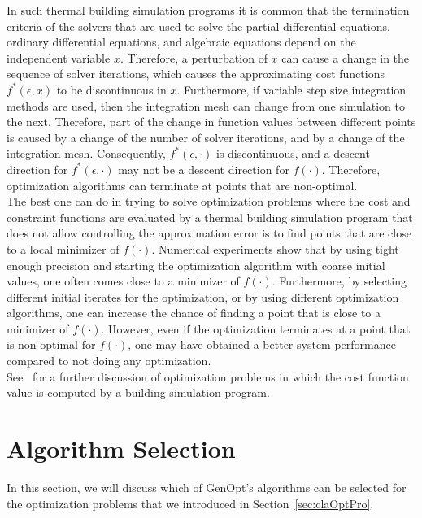 In such thermal building simulation programs
it is common that the termination criteria of the solvers that are used 
to solve the partial differential equations, ordinary differential equations, and
algebraic equations depend on the independent variable $x$.
Therefore, a perturbation of $x$ can cause 
a change in the sequence of solver iterations,
which causes the approximating cost functions $f^*(\epsilon,x)$ 
to be discontinuous in $x$.
Furthermore, if variable step size integration methods are used,
then the integration mesh can change from one simulation to the next.
Therefore, part of the change in function values between different points is
caused by a change of the number of solver iterations, and
by a change of the integration mesh.
Consequently, $f^*(\epsilon,\cdot)$ is discontinuous, and
a descent direction for $f^*(\epsilon,\cdot)$ may not be a descent direction 
for $f(\cdot)$.
Therefore, optimization algorithms
can terminate at points that are non-optimal.\\

The best one can do in trying to solve optimization problems where the cost and constraint functions are evaluated by a thermal building simulation program
that does not allow controlling the approximation error
is to find points that are close to a local minimizer of $f(\cdot)$.
Numerical experiments show that by using tight enough precision and 
starting the optimization algorithm with coarse initial values,
one often comes close to a minimizer of $f(\cdot)$.
Furthermore, by selecting different initial iterates for the optimization,
or by using different optimization algorithms, one can increase the chance of 
finding a point that is close to a minimizer of $f(\cdot)$.
However, even if the optimization terminates at a point 
that is non-optimal for $f(\cdot)$,
one may have obtained a better system performance compared to not doing any optimization.\\

See~\cite{WetterPolak2003:1,WetterWright2003:1} for a further discussion 
of optimization problems in which the cost function value is computed
by a building simulation program.

\section{Algorithm Selection}
\label{sec:AlgSel}
In this section, we will discuss which of GenOpt's algorithms can be selected
for the optimization problems that we introduced in Section~\ref{sec:claOptPro}.\\

